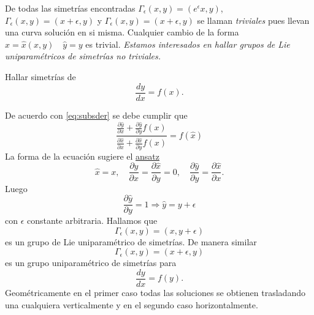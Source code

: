  De todas las simetrías encontradas $\Gamma_{\epsilon}(x,y)=(e^{\epsilon}x,y)$, $\Gamma_{\epsilon}(x,y)=(x+\epsilon,y)$ y  $\Gamma_{\epsilon}(x,y)=(x+\epsilon,y)$ se llaman \emph{triviales} pues llevan una curva solución en si misma.  Cualquier cambio de la forma $\hat{x}=\hat{x}(x,y)\quad \hat{y}=y$ es trivial. \emph{Estamos interesados en hallar grupos de Lie uniparamétricos de simetrías no triviales.}




 \begin{ejemplo} Hallar simetrías de
\[\frac{dy}{dx}=f(x).\]
\end{ejemplo}
De acuerdo con \eqref{eq:subsder} se debe cumplir que
 \[\frac{\frac{\partial\hat{y}}{\partial x}+\frac{\partial\hat{y}}{\partial y}f(x)}{\frac{\partial\hat{x}}{\partial x}+\frac{\partial\hat{x}}{\partial y}f(x)}=f(\hat{x})\]
La forma de la ecuación sugiere el  \href{http://es.wikipedia.org/wiki/Ansatz}{ansatz}
   \[\boxed{\hat{x}=x},\quad \frac{\partial\hat{y}}{\partial x}=\frac{\partial\hat{x}}{\partial y}=0,\quad
   \frac{\partial\hat{y}}{\partial y}=\frac{\partial\hat{x}}{\partial x}. \]
 Luego 
\[\frac{\partial\hat{y}}{\partial y}=1\Rightarrow \boxed{\hat{y}=y+\epsilon} \]
con $\epsilon$ constante arbitraria. Hallamos que
\[\Gamma_{\epsilon}(x,y)=(x,y+\epsilon)\]
es un grupo de Lie uniparamétrico de simetrías. De manera similar
\[\Gamma_{\epsilon}(x,y)=(x+\epsilon,y)\]
es un grupo uniparamétrico de simetrías para 
\[\frac{dy}{dx}=f(y).\]
Geométricamente en el primer caso todas las soluciones se obtienen trasladando una cualquiera verticalmente y en el segundo caso horizontalmente.



